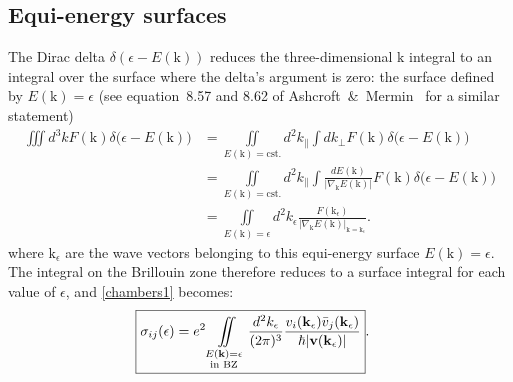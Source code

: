 \documentclass[notitlepage,11pt,nofootinbib]{revtex4-1}
\renewcommand{\vec}[1]{\bm{\mathrm{#1}}}
\begin{document}
\subsection{Equi-energy surfaces}\label{sec_surfaces}
The Dirac delta $\delta(\epsilon-E(\vec k))$ reduces the three-dimensional $\vec k$ integral to an integral over the surface where the delta's argument is zero: the surface defined by $E(\vec k)=\epsilon$ (see equation~8.57 and 8.62 of Ashcroft~\&~Mermin~\cite{ashcroft_solid_1976} for a similar statement)
\begin{align}
\iiint d^3 k 
F(\vec k)\delta\big(\epsilon - E(\vec k)\big)
&=
\iint\limits_{E(\vec k)=\text{cst.}} d^2k_{\parallel}
\int dk_{\perp}
F(\vec k)\delta\big(\epsilon - E(\vec k)\big)
\\
&=
\iint\limits_{E(\vec k)=\text{cst.}} d^2k_{\parallel} 
\int \frac{dE(\vec k)}{|\nabla_{\vec k}E(\vec k)|}
F(\vec k)\delta\big(\epsilon - E(\vec k)\big)
\\
&=
\iint\limits_{E(\vec k)=\epsilon} d^2k_{\epsilon} 
\frac{F(\vec k_{\epsilon})}{|\nabla_{\vec k}E(\vec k)|_{\vec k=\vec k_{\epsilon}}}.
\end{align}
where $\vec k_{\epsilon}$ are the wave vectors belonging to this equi-energy surface $E(\vec k)=\epsilon$. The integral on the Brillouin zone therefore reduces to a surface integral for each value of $\epsilon$, and \eqref{chambers1} becomes:
\begin{align}
\Aboxed{
\sigma_{ij}(\epsilon) 
&=
e^2
\iint\limits_{\substack{E(\vec k)=\epsilon\\ \text{in BZ}}}
\frac{d^2k_{\epsilon}}{(2\pi)^3}
\frac{v_{i}(\vec k_{\epsilon})\bar{v}_{j}(\vec k_{\epsilon})}{\hbar|\vec v(\vec k_{\epsilon})|}
}.
\label{chambersSurfaces}
\end{align}
\end{document}
